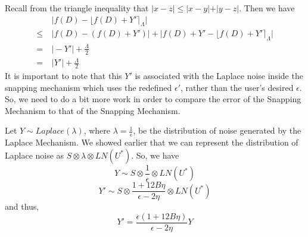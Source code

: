 \documentclass[11pt]{scrartcl} %
\begin{document}
Recall from the triangle inequality that $\vert x-z \vert \leq \vert x-y \vert + \vert y-z \vert$. Then we have
\begin{align}
	                  &\big\vert f(D) - \lfloor f(D) + Y' \rceil_{\Lambda} \big\vert \nonumber \\
    \leq \hspace{3pt} &\big\vert f(D) - (f(D) + Y') \big\vert + \big\vert f(D) + Y' - \lfloor f(D) + Y' \rceil_{\Lambda} \big\vert \nonumber \\
       = \hspace{3pt} &\vert -Y' \vert + \frac{\Lambda}{2} \nonumber \\
	   = \hspace{3pt} &\vert Y' \vert + \frac{\Lambda}{2} \nonumber
\end{align}
It is important to note that this $Y'$ is associated with the Laplace noise inside the snapping mechanism which uses the redefined $\epsilon'$, rather than the user's desired $\epsilon$. So, we need to do a bit more work in order to compare the error of the Snapping Mechanism to that of the Snapping Mechanism. \newline

Let $Y \sim Laplace(\lambda)$, where $\lambda = \frac{1}{\epsilon}$, be the distribution of noise generated by the Laplace Mechanism. We showed earlier that we can represent the distribution of Laplace noise as $S \otimes \lambda \otimes LN(U^*)$. So, we have
\[ Y \sim S \otimes \frac{1}{\epsilon} \otimes LN(U^*) \]
\[ Y' \sim S \otimes \frac{1 + 12B\eta}{\epsilon - 2\eta} \otimes LN(U^*) \]
and thus,
\[ Y' = \frac{\epsilon(1 + 12B\eta)}{\epsilon - 2\eta}Y \]
\end{document}
